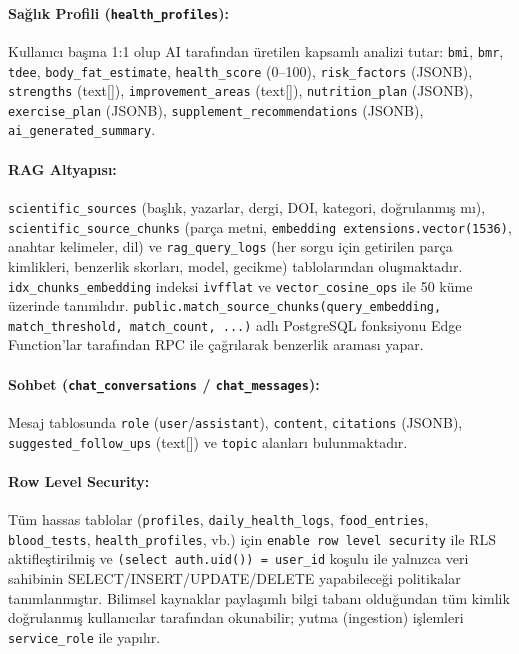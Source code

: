 \paragraph{Sağlık Profili (\texttt{health\_profiles}):}
Kullanıcı başına 1:1 olup AI tarafından üretilen kapsamlı analizi tutar: \texttt{bmi}, \texttt{bmr}, \texttt{tdee}, \texttt{body\_fat\_estimate}, \texttt{health\_score} (0--100), \texttt{risk\_factors} (JSONB), \texttt{strengths} (text[]), \texttt{improvement\_areas} (text[]), \texttt{nutrition\_plan} (JSONB), \texttt{exercise\_plan} (JSONB), \texttt{supplement\_recommendations} (JSONB), \texttt{ai\_generated\_summary}.

\paragraph{RAG Altyapısı:}
\texttt{scientific\_sources} (başlık, yazarlar, dergi, DOI, kategori, doğrulanmış mı), \texttt{scientific\_source\_chunks} (parça metni, \texttt{embedding extensions.vector(1536)}, anahtar kelimeler, dil) ve \texttt{rag\_query\_logs} (her sorgu için getirilen parça kimlikleri, benzerlik skorları, model, gecikme) tablolarından oluşmaktadır. \texttt{idx\_chunks\_embedding} indeksi \texttt{ivfflat} ve \texttt{vector\_cosine\_ops} ile 50 küme üzerinde tanımlıdır. \texttt{public.match\_source\_chunks(query\_embedding, match\_threshold, match\_count, ...)} adlı PostgreSQL fonksiyonu Edge Function'lar tarafından RPC ile çağrılarak benzerlik araması yapar.

\paragraph{Sohbet (\texttt{chat\_conversations} / \texttt{chat\_messages}):}
Mesaj tablosunda \texttt{role} (\texttt{user}/\texttt{assistant}), \texttt{content}, \texttt{citations} (JSONB), \texttt{suggested\_follow\_ups} (text[]) ve \texttt{topic} alanları bulunmaktadır.

\paragraph{Row Level Security:}
Tüm hassas tablolar (\texttt{profiles}, \texttt{daily\_health\_logs}, \texttt{food\_entries}, \texttt{blood\_tests}, \texttt{health\_profiles}, vb.) için \texttt{enable row level security} ile RLS aktifleştirilmiş ve \texttt{(select auth.uid()) = user\_id} koşulu ile yalnızca veri sahibinin SELECT/INSERT/UPDATE/DELETE yapabileceği politikalar tanımlanmıştır. Bilimsel kaynaklar paylaşımlı bilgi tabanı olduğundan tüm kimlik doğrulanmış kullanıcılar tarafından okunabilir; yutma (ingestion) işlemleri \texttt{service\_role} ile yapılır.

